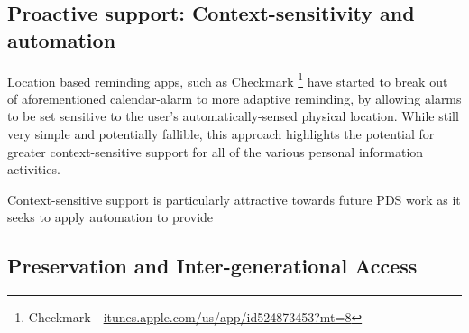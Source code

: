 \documentclass[graybox]{svmult}
\begin{document}
\subsection{Proactive support: Context-sensitivity and automation}
Location based reminding apps, such as Checkmark \footnote{Checkmark - \url{itunes.apple.com/us/app/id524873453?mt=8}} have started to break out of aforementioned calendar-alarm to more adaptive reminding, by allowing alarms to be set sensitive to the user's automatically-sensed physical location.  While still very simple and potentially fallible, this approach highlights the potential for greater context-sensitive support for all of the various personal information activities.  

Context-sensitive support is particularly attractive towards future PDS work as it seeks to apply automation to provide

\subsection{Preservation and Inter-generational Access}



\end{document}
